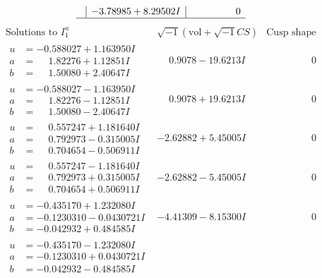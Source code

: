 \documentclass[1p]{elsarticle_modified}
\theoremstyle{definition}
\newcommand{\I}{\sqrt{-1}}
\begin{document}
$$\begin{array}{c|c|c}
 & -3.78985 + 8.29502 I & \phantom{-0.000000 } 0\\
 \hline 
 \end{array}$$\newpage$$\begin{array}{c|c|c}  
\text{Solutions to }I^u_{1}& \I (\text{vol} + \sqrt{-1}CS) & \text{Cusp shape}\\
 \hline 
\begin{aligned}
u &= -0.588027 + 1.163950 I \\
a &= \phantom{-}1.82276 + 1.12851 I \\
b &= \phantom{-}1.50080 + 2.40647 I\end{aligned}
 & \phantom{-}0.9078 - 19.6213 I & \phantom{-0.000000 } 0 \\ \hline\begin{aligned}
u &= -0.588027 - 1.163950 I \\
a &= \phantom{-}1.82276 - 1.12851 I \\
b &= \phantom{-}1.50080 - 2.40647 I\end{aligned}
 & \phantom{-}0.9078 + 19.6213 I & \phantom{-0.000000 } 0 \\ \hline\begin{aligned}
u &= \phantom{-}0.557247 + 1.181640 I \\
a &= \phantom{-}0.792973 - 0.315005 I \\
b &= \phantom{-}0.704654 - 0.506911 I\end{aligned}
 & -2.62882 + 5.45005 I & \phantom{-0.000000 } 0 \\ \hline\begin{aligned}
u &= \phantom{-}0.557247 - 1.181640 I \\
a &= \phantom{-}0.792973 + 0.315005 I \\
b &= \phantom{-}0.704654 + 0.506911 I\end{aligned}
 & -2.62882 - 5.45005 I & \phantom{-0.000000 } 0 \\ \hline\begin{aligned}
u &= -0.435170 + 1.232080 I \\
a &= -0.1230310 - 0.0430721 I \\
b &= -0.042932 + 0.484585 I\end{aligned}
 & -4.41309 - 8.15300 I & \phantom{-0.000000 } 0 \\ \hline\begin{aligned}
u &= -0.435170 - 1.232080 I \\
a &= -0.1230310 + 0.0430721 I \\
b &= -0.042932 - 0.484585 I\end{aligned}

\end{array}$$
\end{document}

